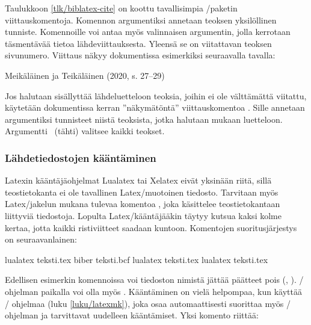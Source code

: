 Taulukkoon \ref{tlk/biblatex-cite} on koottu tavallisimpia
\-/paketin viittauskomentoja. Komennon argumentiksi
annetaan teoksen yksilöllinen tunniste. Komennoille voi antaa myös
valinnaisen argumentin, jolla kerrotaan täsmentävää tietoa
lähdeviittauksesta. Yleensä se on viitattavan teoksen sivunumero.
Viittaus näkyy dokumentissa esimerkiksi seuraavalla tavalla:

\begin{koodilohkosis}
\textcite[27--29]{johdatus} %
\end{koodilohkosis}

\begin{tulossis}
  Meikäläinen ja Teikäläinen (2020, s. 27--29)
\end{tulossis}

\noindent
Jos halutaan sisällyttää lähdeluetteloon teoksia, joihin ei ole
välttämättä viitattu, käytetään dokumentissa kerran ''näkymätöntä''
viittauskomentoa . Sille annetaan argumentiksi
tunnisteet niistä teoksista, jotka halutaan mukaan luetteloon.
Argumentti~\koodi{*} (tähti) valitsee kaikki teokset.

\begin{koodilohkosis}
\nocite{meikäläinen, teikäläinen} %
\nocite{*}                        %
\end{koodilohkosis}

\subsubsection{Lähdetiedostojen kääntäminen}

Latexin kääntäjäohjelmat Lualatex tai Xelatex eivät yksinään riitä,
sillä teostietokanta ei ole tavallinen Latex\-/muotoinen tiedosto.
Tarvitaan myös Latex\-/jakelun mukana tulevaa komentoa ,
joka käsittelee teostietokantaan liittyviä tiedostoja. Lopulta
Latex\-/kääntäjääkin täytyy kutsua kaksi kolme kertaa, jotta kaikki
ristiviitteet saadaan kuntoon. Komentojen suoritusjärjestys on
seuraavanlainen:

\begin{koodilohkosis}
lualatex teksti.tex
biber teksti.bcf
lualatex teksti.tex
lualatex teksti.tex
\end{koodilohkosis}

\noindent
Edellisen esimerkin komennoissa voi tiedoston nimistä jättää päätteet
pois (, ). \-/ ohjelman paikalla
voi olla myös . Kääntäminen on vielä helpompaa, kun
käyttää \-/ ohjelmaa (luku \ref{luku/latexmk}), joka osaa
automaattisesti suorittaa myös \-/ ohjelman ja tarvittavat
uudelleen kääntämiset. Yksi komento riittää:

